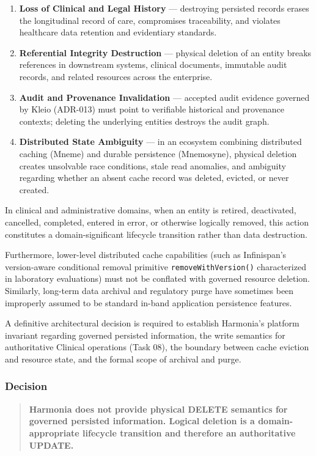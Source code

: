 \begin{enumerate}
    \item \textbf{Loss of Clinical and Legal History} --- destroying persisted records erases the longitudinal record of care, compromises traceability, and violates healthcare data retention and evidentiary standards.
    \item \textbf{Referential Integrity Destruction} --- physical deletion of an entity breaks references in downstream systems, clinical documents, immutable audit records, and related resources across the enterprise.
    \item \textbf{Audit and Provenance Invalidation} --- accepted audit evidence governed by Kleio (ADR-013) must point to verifiable historical and provenance contexts; deleting the underlying entities destroys the audit graph.
    \item \textbf{Distributed State Ambiguity} --- in an ecosystem combining distributed caching (Mneme) and durable persistence (Mnemosyne), physical deletion creates unsolvable race conditions, stale read anomalies, and ambiguity regarding whether an absent cache record was deleted, evicted, or never created.
\end{enumerate}

In clinical and administrative domains, when an entity is retired, deactivated, cancelled, completed, entered in error, or otherwise logically removed, this action constitutes a domain-significant lifecycle transition rather than data destruction.

Furthermore, lower-level distributed cache capabilities (such as Infinispan's version-aware conditional removal primitive \texttt{removeWithVersion()} characterized in laboratory evaluations) must not be conflated with governed resource deletion. Similarly, long-term data archival and regulatory purge have sometimes been improperly assumed to be standard in-band application persistence features.

A definitive architectural decision is required to establish Harmonia's platform invariant regarding governed persisted information, the write semantics for authoritative Clinical operations (Task 08), the boundary between cache eviction and resource state, and the formal scope of archival and purge.

\subsubsection{Decision}

\begin{quote}
    \textbf{Harmonia does not provide physical DELETE semantics for governed persisted information. Logical deletion is a domain-appropriate lifecycle transition and therefore an authoritative UPDATE.}
\end{quote}

